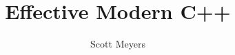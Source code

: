 \documentclass[8pt,a4paper]{book}
\begin{document}
\title{\E Effective Modern C++}
\author{\E Scott Meyers}

\maketitle

\tableofcontents



\end{document}
